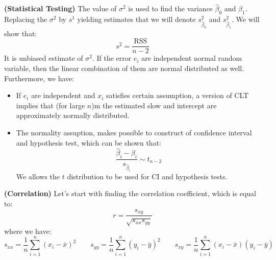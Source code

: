 \begin{remark}{\textbf{(Statistical Testing)}}
    The value of $\sigma^2$ is used to find the variance $\hat{\beta}_0$ and $\hat{\beta}_1$. Replacing the $\sigma^2$ by $s^1$ yielding estimates that we will denote $s^2_{\hat{\beta}_0}$ and $s^2_{\hat{\beta}_1}$. We will show that:
    \begin{equation*}
        s^2 = \frac{\text{RSS}}{n-2}
    \end{equation*}
    It is unbiased estimate of $\sigma^2$. If the error $e_i$ are independent normal random variable, then the linear combination of them are normal distributed as well. Furthermore, we have:
    \begin{itemize}
        \item If $e_i$ are independent and $x_i$ satisfies certain assumption, a version of CLT implies that (for large $n$)m the estimated slow and intercept are approximately normally distributed. 
        \item The normality assuption, makes possible to construct of confidence interval and hypothesis test, which can be shown that:
        \begin{equation*}
            \frac{\hat{\beta}_i - \beta_i}{s_{\hat{\beta}_i}}\sim t_{n-2}
        \end{equation*}
        We allows the $t$ distribution to be used for CI and hypothesis tests.
    \end{itemize}
\end{remark}

\begin{remark}{\textbf{(Correlation)}}
    Let's start with finding the correlation coefficient, which is equal to:
    \begin{equation*}
        r = \frac{s_{xy}}{\sqrt{s_{xx}s_{yy}}}
    \end{equation*}
    where we have:
    \begin{equation*}
        s_{xx} = \frac{1}{n}\sum^n_{i=1}(x_i-\bar{x})^2 \qquad 
        s_{yy} = \frac{1}{n}\sum^n_{i=1}(y_i-\bar{y})^2 \qquad 
        s_{xy} = \frac{1}{n}\sum^n_{i=1}(x_i-\bar{x})(y_i-\bar{y}) \qquad 
    \end{equation*}
\end{remark}

